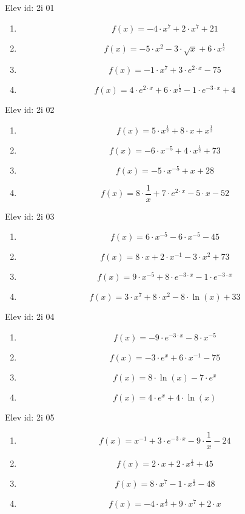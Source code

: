 \item Elev id: 2i 01
\begin{enumerate}
\item 
$$
f(x)=-4\cdot x^7+2\cdot x^7+21
$$
\item 
$$
f(x)=-5\cdot x^2-3\cdot \sqrt{x}+6\cdot x^{\frac{1}{2}}
$$
\item 
$$
f(x)=-1\cdot x^7+3\cdot e^{2\cdot x}-75
$$
\item 
$$
f(x)=4\cdot e^{2\cdot x}+6\cdot x^{\frac{1}{2}}-1\cdot e^{-3\cdot x}+4
$$
\end{enumerate}
\item Elev id: 2i 02
\begin{enumerate}
\item 
$$
f(x)=5\cdot x^{\frac{1}{2}}+8\cdot x+x^{\frac{1}{2}}
$$
\item 
$$
f(x)=-6\cdot x^{-5}+4\cdot x^{\frac{1}{2}}+73
$$
\item 
$$
f(x)=-5\cdot x^{-5}+x+28
$$
\item 
$$
f(x)=8\cdot \frac{1}{x}+7\cdot e^{2\cdot x}-5\cdot x-52
$$
\end{enumerate}
\item Elev id: 2i 03
\begin{enumerate}
\item 
$$
f(x)=6\cdot x^{-5}-6\cdot x^{-5}-45
$$
\item 
$$
f(x)=8\cdot x+2\cdot x^{-1}-3\cdot x^2+73
$$
\item 
$$
f(x)=9\cdot x^{-5}+8\cdot e^{-3\cdot x}-1\cdot e^{-3\cdot x}
$$
\item 
$$
f(x)=3\cdot x^7+8\cdot x^2-8\cdot \ln(x)+33
$$
\end{enumerate}
\item Elev id: 2i 04
\begin{enumerate}
\item 
$$
f(x)=-9\cdot e^{-3\cdot x}-8\cdot x^{-5}
$$
\item 
$$
f(x)=-3\cdot e^x+6\cdot x^{-1}-75
$$
\item 
$$
f(x)=8\cdot \ln(x)-7\cdot e^x
$$
\item 
$$
f(x)=4\cdot e^x+4\cdot \ln(x)
$$
\end{enumerate}
\item Elev id: 2i 05
\begin{enumerate}
\item 
$$
f(x)=x^{-1}+3\cdot e^{-3\cdot x}-9\cdot \frac{1}{x}-24
$$
\item 
$$
f(x)=2\cdot x+2\cdot x^{\frac{1}{2}}+45
$$
\item 
$$
f(x)=8\cdot x^7-1\cdot x^{\frac{1}{2}}-48
$$
\item 
$$
f(x)=-4\cdot x^{\frac{1}{2}}+9\cdot x^7+2\cdot x
$$
\end{enumerate}
